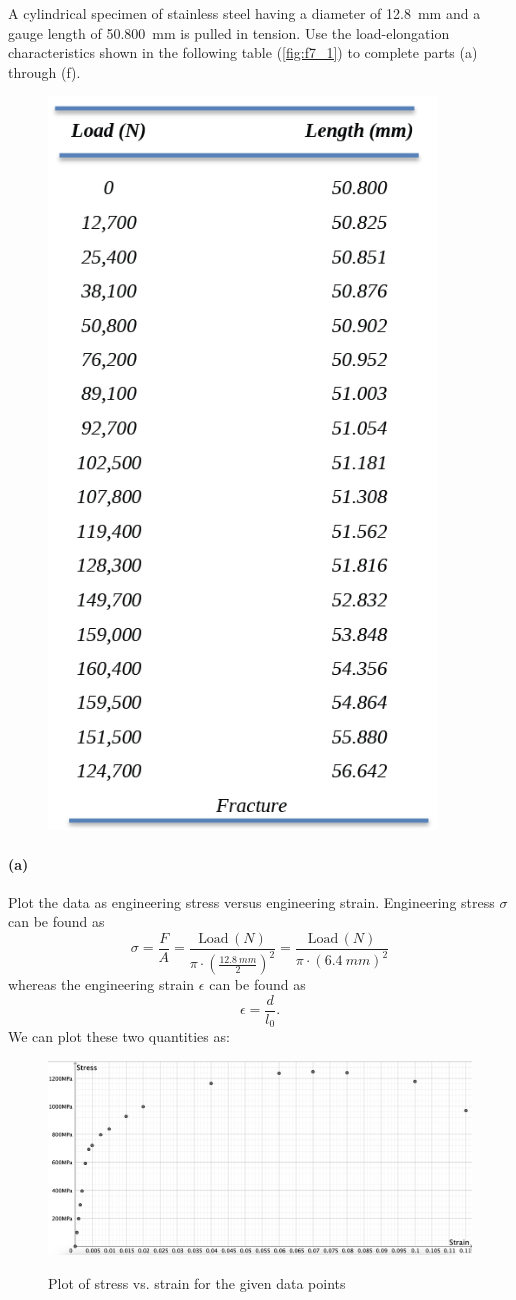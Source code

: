 
 A cylindrical specimen of stainless steel having a diameter of \qty{12,8}{mm} and a gauge length of \qty{50,800}{mm} is pulled in tension. Use the load-elongation characteristics shown in the following table (\autoref{fig:f7_1}) to complete parts (a) through (f).

\begin{figure} [ht]
  \centering
  \includegraphics[width=0.35\linewidth]{./figures/f7_1.png}
  \label{fig:f7_1}
\end{figure}

\paragraph{(a)} Plot the data as engineering stress versus engineering strain.
\bigbreak
Engineering stress $\sigma$ can be found as
\[ 
  \sigma = \frac{F}{A} = \frac{\text{Load}\,(N)}{\pi \cdot \left( \frac{\qty{12,8}{mm}}{2} \right)^2} = \frac{\text{Load}\, (N)}{\pi \cdot (\qty{6,4}{mm})^2}
\]
whereas the engineering strain $\epsilon$ can be found as
\[ 
\epsilon = \frac{d}{l_0}
.\]
We can plot these two quantities as:
\begin{figure} [ht]
  \centering
  \caption{Plot of stress vs. strain for the given data points}
  \includegraphics[width=0.8\linewidth]{./figures/f7_2.png}
  \label{fig:f7_2}
\end{figure}

